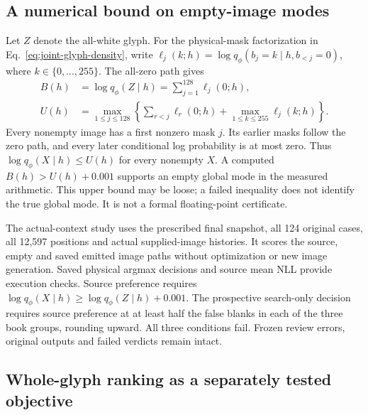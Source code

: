 \subsection*{A numerical bound on empty-image modes}

Let $Z$ denote the all-white glyph. For the physical-mask factorization in
Eq.~\ref{eq:joint-glyph-density}, write
$\ell_j(k;h)=\log q_\phi(b_j=k\mid h,b_{<j}=0)$, where $k\in\{0,\ldots,255\}$.
The all-zero path gives
\begin{equation}
 \begin{aligned}
 B(h)&=\log q_\phi(Z\mid h)=\sum_{j=1}^{128}\ell_j(0;h),\\
 U(h)&=\max_{1\le j\le128}\left\{
       \sum_{r<j}\ell_r(0;h)
       +\max_{1\le k\le255}\ell_j(k;h)\right\}.
 \end{aligned}
 \label{eq:empty-glyph-bound}
\end{equation}
Every nonempty image has a first nonzero mask $j$. Its earlier masks follow
the zero path, and every later conditional log probability is at most zero.
Thus $\log q_\phi(X\mid h)\le U(h)$ for every nonempty $X$. A computed
$B(h)>U(h)+0.001$ supports an empty global mode in the measured arithmetic.
This upper bound may be loose; a failed inequality does not identify the true
global mode. It is not a formal floating-point certificate.

The actual-context study uses the prescribed final snapshot, all 124 original
cases, all 12,597 positions and actual supplied-image histories. It scores the
source, empty and saved emitted image paths without optimization or new image
generation. Saved physical argmax decisions and source mean NLL provide
execution checks. Source preference requires
$\log q_\phi(X\mid h)\ge\log q_\phi(Z\mid h)+0.001$. The prospective search-only
decision requires source preference at at least half the false blanks in each
of the three book groups, rounding upward. All three conditions fail. Frozen
review errors, original outputs and failed verdicts remain intact.

\subsection*{Whole-glyph ranking as a separately tested objective}

